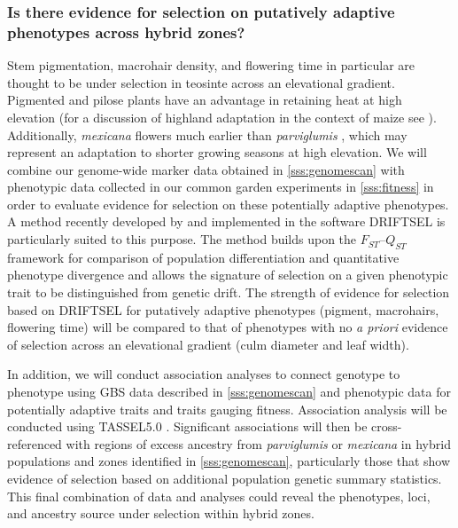 \subsubsection{Is there evidence for selection on putatively adaptive phenotypes across hybrid zones?}
\label{sss:driftsel}

Stem pigmentation, macrohair density, and flowering time in particular are thought to be under selection in teosinte across an elevational gradient.  Pigmented and pilose plants have an advantage in retaining heat at high elevation (for a discussion of highland adaptation in the context of maize see \citealt{Eagles1994}). Additionally, \emph{mexicana} flowers much earlier than \emph{parviglumis} \citep{Rodriguez2006}, which may represent an adaptation to shorter growing seasons at high elevation. We will combine our genome-wide marker data obtained in \ref{sss:genomescan} with phenotypic data collected in our common garden experiments in \ref{sss:fitness} in order to evaluate evidence for selection on these potentially adaptive phenotypes.  A method recently developed by \citet{Ovaskainen2011} and implemented in the software DRIFTSEL \citep{Karhunen2013} is particularly suited to this purpose.  The method builds upon the $F_{ST}$--$Q_{ST}$  framework for comparison of population differentiation and quantitative phenotype divergence and allows the signature of selection on a given phenotypic trait to be distinguished from genetic drift.  The strength of evidence for selection based on DRIFTSEL for putatively adaptive phenotypes (pigment, macrohairs, flowering time) will be compared to that of phenotypes with no \emph{a priori} evidence of selection across an elevational gradient (culm diameter and leaf width). 

In addition, we will conduct association analyses to connect genotype to phenotype using GBS data described in \ref{sss:genomescan} and phenotypic data for potentially adaptive traits and traits gauging fitness.  Association analysis will be conducted using TASSEL5.0 \citep{Bradbury2007}. Significant associations will then be cross-referenced with regions of excess ancestry from \emph{parviglumis} or \emph{mexicana} in hybrid populations and zones identified in \ref{sss:genomescan}, particularly those that show evidence of selection based on additional population genetic summary statistics.  This final combination of data and analyses could reveal the phenotypes, loci, and ancestry source under selection within hybrid zones.

